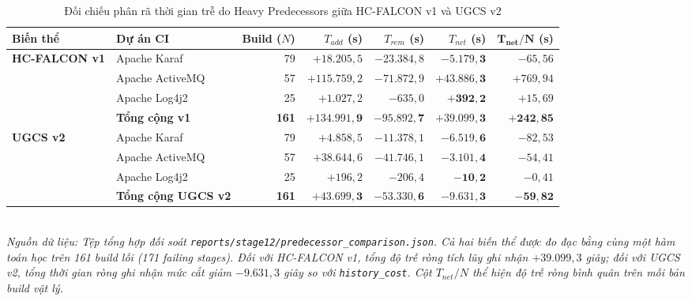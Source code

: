 \begin{table}[H]
\centering
\caption{Đối chiếu phân rã thời gian trễ do Heavy Predecessors giữa HC-FALCON v1 và UGCS v2}
\label{tab:heavy_predecessors_breakdown}
\small
\begin{adjustbox}{max width=\textwidth}
\begin{tabular}{llrrrrr}
\toprule
\textbf{Biến thể} & \textbf{Dự án CI} & \textbf{Build ($N$)} & \textbf{$T_{add}$ (s)} & \textbf{$T_{rem}$ (s)} & \textbf{$T_{net}$ (s)} & $\mathbf{T_{net}/N}$ \textbf{(s)} \\
\midrule
\multirow{4}{*}{\textbf{HC-FALCON v1}} 
  & Apache Karaf   & 79 & $+18.205,5$ & $-23.384,8$ & $\mathbf{-5.179,3}$ & $-65,56$ \\
  & Apache ActiveMQ & 57 & $+115.759,2$ & $-71.872,9$ & $\mathbf{+43.886,3}$ & $+769,94$ \\
  & Apache Log4j2  & 25 & $+1.027,2$ & $-635,0$ & $\mathbf{+392,2}$ & $+15,69$ \\
\cmidrule{2-7}
  & \textbf{Tổng cộng v1} & \textbf{161} & $\mathbf{+134.991,9}$ & $\mathbf{-95.892,7}$ & $\mathbf{+39.099,3}$ & $\mathbf{+242,85}$ \\
\midrule
\multirow{4}{*}{\textbf{UGCS v2}} 
  & Apache Karaf   & 79 & $+4.858,5$ & $-11.378,1$ & $\mathbf{-6.519,6}$ & $-82,53$ \\
  & Apache ActiveMQ & 57 & $+38.644,6$ & $-41.746,1$ & $\mathbf{-3.101,4}$ & $-54,41$ \\
  & Apache Log4j2  & 25 & $+196,2$ & $-206,4$ & $\mathbf{-10,2}$ & $-0,41$ \\
\cmidrule{2-7}
  & \textbf{Tổng cộng UGCS v2} & \textbf{161} & $\mathbf{+43.699,3}$ & $\mathbf{-53.330,6}$ & $\mathbf{-9.631,3}$ & $\mathbf{-59,82}$ \\
\bottomrule
\end{tabular}
\end{adjustbox}
\vspace{1mm}\\
\footnotesize{\textit{Nguồn dữ liệu: Tệp tổng hợp đối soát \texttt{reports/stage12/predecessor\_comparison.json}. Cả hai biến thể được đo đạc bằng cùng một hàm toán học trên 161 build lỗi (171 failing stages). Đối với HC-FALCON v1, tổng độ trễ ròng tích lũy ghi nhận $+39.099,3$ giây; đối với UGCS v2, tổng thời gian ròng ghi nhận mức cắt giảm $-9.631,3$ giây so với \texttt{history\_cost}. Cột $T_{net}/N$ thể hiện độ trễ ròng bình quân trên mỗi bản build vật lý.}}
\end{table}


